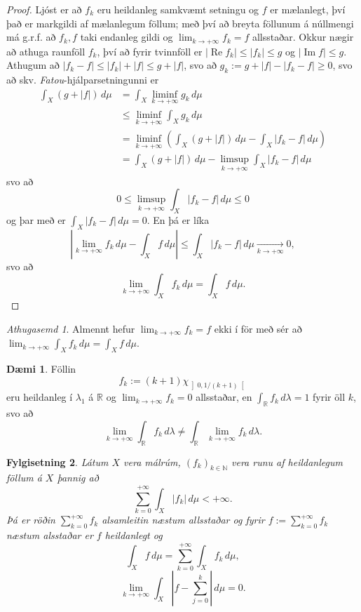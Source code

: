 \documentclass[a4paper,icelandic,11pt]{book}
\theoremstyle{plain}      \newtheorem{setn}{Setning}[chapter]
\newtheorem{fylgi}[setn]{Fylgisetning}
\theoremstyle{definition} \newtheorem{skilgr}[setn]{Skilgreining}
\newtheorem{daemi}[setn]{Dæmi}
\theoremstyle{remark}     \newtheorem*{ath}{Athugasemd}
\newcommand{\R}{\mathbb R}
\newcommand{\N}{\mathbb N}
\DeclareMathOperator{\im}{Im}
\DeclareMathOperator{\re}{Re}
\begin{document}
\begin{proof}
  Ljóst er að $f_{k}$ eru heildanleg samkvæmt setningu og $f$ er
  mælanlegt, því það er markgildi af mælanlegum föllum; með því að
  breyta föllunum á núllmengi má g.r.f. að $f_{k},f$ taki endanleg
  gildi og $\lim_{k\to+\infty}f_{k}=f$ allsstaðar. Okkur nægir að
  athuga raunföll $f_{k}$, því að fyrir tvinnföll er $|\re
  f_{k}|\le|f_{k}|\le g$ og $|\im f|\le g$. Athugum að
  $|f_{k}-f|\le|f_{k}|+|f|\le g+|f|$, svo að
  $g_{k}:=g+|f|-|f_{k}-f|\ge 0$, svo að
  skv. \emph{Fatou}-hjálparsetningunni er
  \begin{align*}
    \int_{X}(g+|f|)\,d\mu
    &= \int_{X}\liminf_{k\to+\infty}g_{k}\,d\mu \\
    &\le \liminf_{k\to+\infty}\int_{X}g_{k}\,d\mu \\
    &= \liminf_{k\to+\infty}\left(
      \int_{X}(g+|f|)\,d\mu
      - \int_{X}|f_{k}-f|\,d\mu
    \right) \\
    &= \int_{X}(g+|f|)\,d\mu
    - \limsup_{k\to+\infty}\int_{X}|f_{k}-f|\,d\mu
  \end{align*}
  svo að
  \[
  0
  \le \limsup_{k\to+\infty}\int_{X}|f_{k}-f|\,d\mu
  \le 0
  \]
  og þar með er $\int_{X}|f_{k}-f|\,d\mu = 0$. En þá er líka
  \[
  \left|
    \lim_{k\to+\infty}f_{k}\,d\mu
    - \int_{X}f\,d\mu
  \right|
  \le \int_{X}|f_{k}-f|\,d\mu
  \xrightarrow[k\to+\infty]{}0,
  \]
  svo að
  \[
  \lim_{k\to+\infty}\int_{X}f_{k}\,d\mu
  = \int_{X}f\,d\mu.
  \]
\end{proof}
\begin{ath}
  Almennt hefur $\lim_{k\to+\infty}f_{k}=f$ ekki í för með sér að
  $\lim_{k\to+\infty}\int_{X}f_{k}\,d\mu=\int_{X}f\,d\mu$.
\end{ath}
\begin{daemi}
  Föllin
  \[
  f_{k} := (k+1)\chi_{\left]0,1/(k+1)\right[}
  \]
  eru heildanleg í $\lambda_{1}$ á $\R$ og
  $\lim_{k\to+\infty}f_{k}=0$ allsstaðar, en
  $\int_{\R}f_{k}\,d\lambda=1$ fyrir öll $k$, svo að
  \[
  \lim_{k\to+\infty}\int_{\R}f_{k}\,d\lambda
  \ne \int_{\R}\lim_{k\to+\infty}f_{k}\,d\lambda .
  \]
\end{daemi}
\begin{fylgi}
  Látum $X$ vera málrúm, $(f_{k})_{k\in\N}$ vera runu af heildanlegum
  föllum á $X$ þannig að
  \[
  \sum_{k=0}^{+\infty}\int_{X}|f_{k}|\,d\mu
  < +\infty .
  \]
  Þá er röðin $\sum_{k=0}^{+\infty}f_{k}$ alsamleitin næstum
  allsstaðar og fyrir $f:=\sum_{k=0}^{+\infty}f_{k}$ næstum alsstaðar
  er $f$ heildanlegt og
  \[
  \int_{X}f\,d\mu
  = \sum_{k=0}^{+\infty}\int_{X}f_{k}\,d\mu,
  \]
  \[
  \lim_{k\to+\infty}\int_{X}\left|
    f - \sum_{j=0}^{k}
  \right|\,d\mu
  = 0.
  \]
\end{fylgi}
\end{document}
